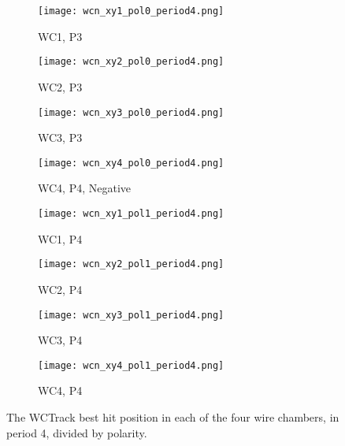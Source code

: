            \begin{figure}[h]	   
            \centering
   
               \begin{subfigure}[b]{0.23\textwidth}
            \centering
            \texttt{[image: wcn\_xy1\_pol0\_period4.png]}
            \caption{WC1, P3}
            \label{fig_wc1_p3}
            \end{subfigure}
            \hfill             
             \begin{subfigure}[b]{0.23\textwidth}
            \centering
            \texttt{[image: wcn\_xy2\_pol0\_period4.png]}
            \caption{WC2, P3}
            \label{fig_wc2_p3}
            \end{subfigure}
            \hfill 
              \begin{subfigure}[b]{0.23\textwidth}
            \centering
            \texttt{[image: wcn\_xy3\_pol0\_period4.png]}
            \caption{WC3, P3}
            \label{fig_wc3_p3}
            \end{subfigure}
            \hfill    
             \begin{subfigure}[b]{0.23\textwidth}
            \centering
            \texttt{[image: wcn\_xy4\_pol0\_period4.png]}
            \caption{WC4, P4, Negative}
            \label{fig_wc4_p3}
            \end{subfigure}
            \hfill
            \begin{subfigure}[b]{0.23\textwidth}
            \centering
            \texttt{[image: wcn\_xy1\_pol1\_period4.png]}
            \caption{WC1, P4}
            \label{fig_wc1_p4}
            \end{subfigure}
            \hfill             
             \begin{subfigure}[b]{0.23\textwidth}
            \centering
            \texttt{[image: wcn\_xy2\_pol1\_period4.png]}
            \caption{WC2, P4}
            \label{fig_wc2_p4}
            \end{subfigure}
            \hfill 
              \begin{subfigure}[b]{0.23\textwidth}
            \centering
            \texttt{[image: wcn\_xy3\_pol1\_period4.png]}
            \caption{WC3, P4}
            \label{fig_wc3_p4}
            \end{subfigure}
            \hfill    
             \begin{subfigure}[b]{0.23\textwidth}
            \centering
            \texttt{[image: wcn\_xy4\_pol1\_period4.png]}
            \caption{WC4, P4}
            \label{fig_wc4_p4}
            \end{subfigure}
            \hfill
   \caption[short]{The WCTrack best hit position in each of the four wire chambers, in period 4, divided by polarity.}
   \label{fig_xyhitspol}
  \end{figure}
  
